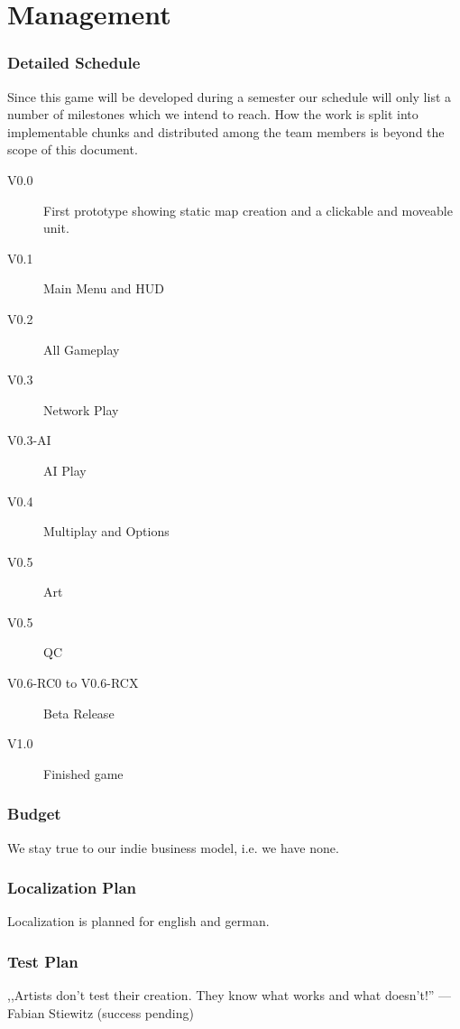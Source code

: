 \part{Management}
\section{Detailed Schedule}
Since this game will be developed during a semester our schedule will only list
a number of milestones which we intend to reach. How the work is split into implementable
chunks and distributed among the team members is beyond the scope of this document.
\begin{description}
    \item[V0.0] First prototype showing static map creation and a clickable and moveable unit.
    \item[V0.1] Main Menu and HUD
    \item[V0.2] All Gameplay
    \item[V0.3] Network Play
    \item[V0.3-AI] AI Play
    \item[V0.4] Multiplay and Options
    \item[V0.5] Art
    \item[V0.5] QC
    \item[V0.6-RC0 to V0.6-RCX] Beta Release
    \item[V1.0] Finished game
\end{description}
\section{Budget}
We stay true to our indie business model, i.e. we have none.
\section{Localization Plan}
Localization is planned for english and german.
\section{Test Plan}
,,Artists don't test their creation. They know what works and what doesn't!'' --- Fabian Stiewitz (success pending)
